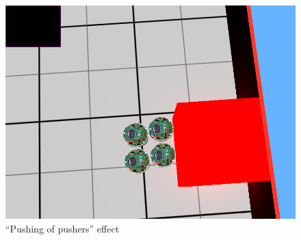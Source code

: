 \documentclass[12pt]{article}
\begin{document}
	\begin{figure}[H]
		\centering
		\includegraphics[width=.8\columnwidth]{./images/finalImplementationCompletePushingOfPushers.png}%
		\caption{"`Pushing of pushers"' effect}
		\label{fig:pushing}	
	\end{figure}
\end{document}
